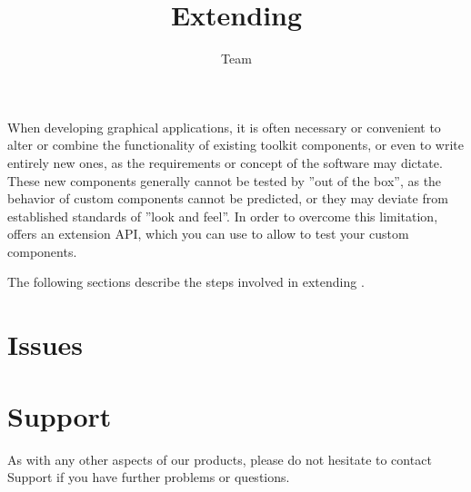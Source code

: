 \documentclass[en,twoside,manual,guidancer]{bxreport}
\begin{document}
%
\title{Extending \jb{}}
\author*{\jb{} Team}{}
\maketitle

\setcounter{tocdepth}{2}
\tableofcontents
\renewcommand{\bxcomment}[2]{}%
\clearpage

\setcounter{secnumdepth}{2}

When developing graphical applications, it is often necessary or
convenient to alter or combine the functionality of existing toolkit
components, or even to write entirely new ones, as the requirements or
concept of the software may dictate. These new components
generally cannot be tested by \jb{}{} ''out of the box'', as the
behavior of custom components cannot be predicted, or they may deviate
from established standards of ''look and feel''. In order to overcome this limitation, \jb{}{} offers an extension
API, which you can use to allow \jb{} to test your custom components.

The following sections describe the steps involved in extending
\jb{}{}.

\clearpage



\clearpage

\chapter{Issues}


\clearpage
\chapter{Support}

As with any other aspects of our products, please do not hesitate to
contact \jb{} Support if you have further problems or questions.

\clearpage
\end{document}
